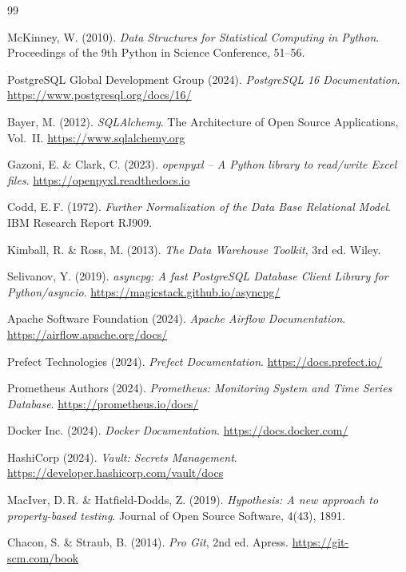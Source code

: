 ﻿\documentclass[12pt,a4paper]{report}
\theoremstyle{definition}
\theoremstyle{remark}
\begin{document}
\begin{thebibliography}{99}

  McKinney, W. (2010).
  \textit{Data Structures for Statistical Computing in Python}.
  Proceedings of the 9th Python in Science Conference, 51--56.

  PostgreSQL Global Development Group (2024).
  \textit{PostgreSQL 16 Documentation}.
  \url{https://www.postgresql.org/docs/16/}

  Bayer, M. (2012).
  \textit{SQLAlchemy}.
  The Architecture of Open Source Applications, Vol.~II.
  \url{https://www.sqlalchemy.org}

  Gazoni, E. \& Clark, C. (2023).
  \textit{openpyxl -- A Python library to read/write Excel files}.
  \url{https://openpyxl.readthedocs.io}

  Codd, E.\,F. (1972).
  \textit{Further Normalization of the Data Base Relational Model}.
  IBM Research Report RJ909.

  Kimball, R. \& Ross, M. (2013).
  \textit{The Data Warehouse Toolkit}, 3rd ed.
  Wiley.

  Selivanov, Y. (2019).
  \textit{asyncpg: A fast PostgreSQL Database Client Library for Python/asyncio}.
  \url{https://magicstack.github.io/asyncpg/}

  Apache Software Foundation (2024).
  \textit{Apache Airflow Documentation}.
  \url{https://airflow.apache.org/docs/}

  Prefect Technologies (2024).
  \textit{Prefect Documentation}.
  \url{https://docs.prefect.io/}

  Prometheus Authors (2024).
  \textit{Prometheus: Monitoring System and Time Series Database}.
  \url{https://prometheus.io/docs/}

  Docker Inc. (2024).
  \textit{Docker Documentation}.
  \url{https://docs.docker.com/}

  HashiCorp (2024).
  \textit{Vault: Secrets Management}.
  \url{https://developer.hashicorp.com/vault/docs}

  MacIver, D.\,R. \& Hatfield-Dodds, Z. (2019).
  \textit{Hypothesis: A new approach to property-based testing}.
  Journal of Open Source Software, 4(43), 1891.

  Chacon, S. \& Straub, B. (2014).
  \textit{Pro Git}, 2nd ed.
  Apress. \url{https://git-scm.com/book}


\end{thebibliography}
\end{document}
